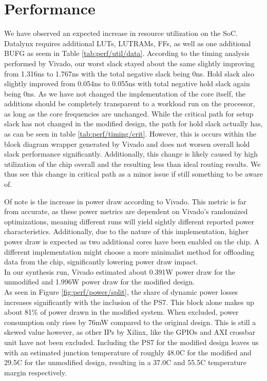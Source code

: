 \documentclass[../bachelor_paper.tex]{subfiles}
\begin{document}
\chapter{Performance}
    \label{ch:perf}
    
We have observed an expected increase in resource utilization on the \ac{SoC}. Datalynx requires additional \acp{LUT}, \acsp{LUTRAM}, \acp{FF}, as well as one additional \ac{BUFG} as seem in Table \ref{tab:perf/util/data}. According to the timing analysis performed by Vivado, our worst slack stayed about the same slightly improving from 1.316ns to 1.767ns with the total negative slack being 0ns. Hold slack also slightly improved from 0.054ns to 0.055ns with total negative hold slack again being 0ns. As we have not changed the implementation of the core itself, the additions should be completely transparent to a workload run on the processor, as long as the core frequencies are unchanged. While the critical path for setup slack has not changed in the modified design, the path for hold slack actually has, as can be seen in table \ref{tab:perf/timing/crit}. However, this is occurs within the block diagram wrapper generated by Vivado and does not worsen overall hold slack performance significantly. Additionally, this change is likely caused by high utilization of the chip overall and the resulting less than ideal routing results. We thus see this change in critical path as a minor issue if still something to be aware of.

Of note is the increase in power draw according to Vivado. This metric is far from accurate, as these power metrics are dependent on Vivado's randomized optimizations, meaning different runs will yield sightly different reported power characteristics. Additionally, due to the nature of this implementation, higher power draw is expected as two additional cores have been enabled on the chip. A different implementation might choose a more minimalist method for offloading data from the chip, significantly lowering power draw impact.\\
In our synthesis run, Vivado estimated about 0.391W power draw for the unmodified and 1.996W power draw for the modified design. \\
As seen in Figure \ref{fig:perf/power/split}, the share of dynamic power losses increases significantly with the inclusion of the \ac{PS7}. This block alone makes up about 81\% of power drawn in the modified system. When excluded, power consumption only rises by 76mW compared to the original design. This is still a skewed value however, as other \acp{IP} by Xilinx, like the GPIOs and AXI crossbar unit have not been excluded. Including the \ac{PS7} for the modified design leaves us with an estimated junction temperature of roughly 48.0\textdegree C for the modified and 29.5\textdegree C for the unmodified design, resulting in a 37.0\textdegree C and 55.5\textdegree C temperature margin respectively.
\end{document}
